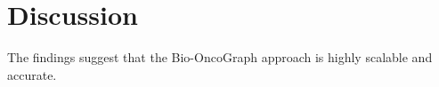 \section{Discussion}
The findings suggest that the Bio-OncoGraph approach is highly scalable and accurate.
